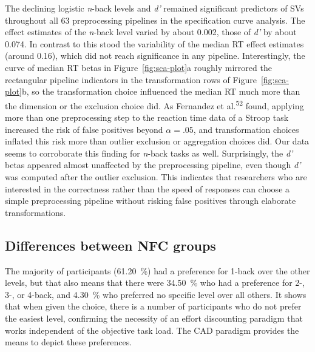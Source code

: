 \documentclass[
  man,floatsintext]{apa6}
\begin{document}
The declining logistic \emph{n}-back levels and \emph{d'} remained significant predictors of SVs throughout all 63 preprocessing pipelines in the specification curve analysis.
The effect estimates of the \emph{n}-back level varied by about 0.002, those of \emph{d'} by about 0.074.
In contrast to this stood the variability of the median RT effect estimates (around 0.16), which did not reach significance in any pipeline.
Interestingly, the curve of median RT betas in Figure~\ref{fig:sca-plot}a roughly mirrored the rectangular pipeline indicators in the transformation rows of Figure~\ref{fig:sca-plot}b, so the transformation choice influenced the median RT much more than the dimension or the exclusion choice did.
As Fernandez et al.\textsuperscript{52} found, applying more than one preprocessing step to the reaction time data of a Stroop task increased the risk of false positives beyond \(\alpha=.05\), and transformation choices inflated this risk more than outlier exclusion or aggregation choices did.
Our data seems to corroborate this finding for \emph{n}-back tasks as well.
Surprisingly, the \emph{d'} betas appeared almost unaffected by the preprocessing pipeline, even though \emph{d'} was computed after the outlier exclusion.
This indicates that researchers who are interested in the correctness rather than the speed of responses can choose a simple preprocessing pipeline without risking false positives through elaborate transformations.

\hypertarget{differences-between-nfc-groups-1}{%
\subsection{Differences between NFC groups}\label{differences-between-nfc-groups-1}}

The majority of participants (61.20~\%) had a preference for 1-back over the other levels, but that also means that there were 34.50~\% who had a preference for 2-, 3-, or 4-back, and 4.30~\% who preferred no specific level over all others.
It shows that when given the choice, there is a number of participants who do not prefer the easiest level, confirming the necessity of an effort discounting paradigm that works independent of the objective task load.
The CAD paradigm provides the means to depict these preferences.
\end{document}
